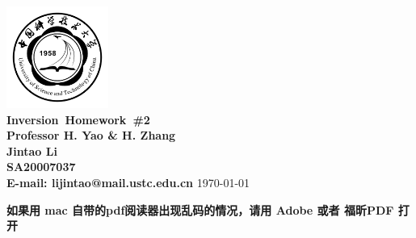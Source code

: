 \documentclass{article}
\makeatletter
\newcommand{\hmwkTitle}{Homework\ \#2}
\newcommand{\hmwkClass}{Inversion}
\newcommand{\hmwkClassInstructor}{Professor H. Yao \& H. Zhang}
\newcommand{\hmwkAuthorName}{\textbf{Jintao Li}}
\newcommand{\hmwkAuthorID}{\textbf{SA20007037}}
\newcommand{\hmwkAuthoremail}{\textbf{E-mail: lijintao@mail.ustc.edu.cn}}
\makeatother
\begin{document}
\begin{titlepage}

\begin{center}

\textcolor{ustcblue}{\includegraphics[width=0.25\textwidth]{./ustc_logo_fig.pdf} \\ [1cm]}
{ \Huge \bfseries \hmwkClass\ \hmwkTitle}\\[1cm]

\large \textbf{\hmwkClassInstructor} \\ [5cm]

\large \hmwkAuthorName \\ [0.25cm]
\large \hmwkAuthorID \\ [0.25cm]
\large \hmwkAuthoremail
\vfill
{\large \today}

\end{center}

\end{titlepage}

\textbf{如果用 mac 自带的pdf阅读器出现乱码的情况，请用 Adobe 或者 福昕PDF 打开}
\end{document}

